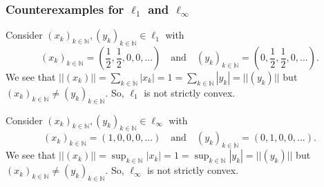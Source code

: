 \documentclass[a4paper]{article}
\begin{document}
\subsubsection*{Counterexamples for $\ell_1$ and $\ell_\infty$}
Consider $(x_k)_{k \in \mathbb N}, (y_k)_{k \in \mathbb N} \in \ell_1$ with
\[
	(x_k)_{k \in \mathbb N} = (\frac{1}{2}, \frac{1}{2}, 0,0,...) \quad \text{and} \quad (y_k)_{k \in \mathbb N} = (0, \frac{1}{2}, \frac{1}{2},0,...).
\]
We see that $||(x_k)|| = \sum_{k \in \mathbb N}|x_k| = 1 = \sum_{k \in \mathbb N}|y_k| = ||(y_k)||$ but $(x_k)_{k \in \mathbb N} \neq (y_k)_{k \in \mathbb N}$. So, $\ell_1$ is not strictly convex.

Consider $(x_k)_{k \in \mathbb N}, (y_k)_{k \in \mathbb N} \in \ell_\infty$ with
\[
	(x_k)_{k \in \mathbb N} = (1,0, 0,0,...) \quad \text{and} \quad (y_k)_{k \in \mathbb N} = (0, 1, 0,0,...).
\]
We see that $||(x_k)|| = \sup_{k \in \mathbb N}|x_k| = 1 = \sup_{k \in \mathbb N}|y_k| = ||(y_k)||$ but $(x_k)_{k \in \mathbb N} \neq (y_k)_{k \in \mathbb N}$. So, $\ell_\infty$ is not strictly convex.
\end{document}
